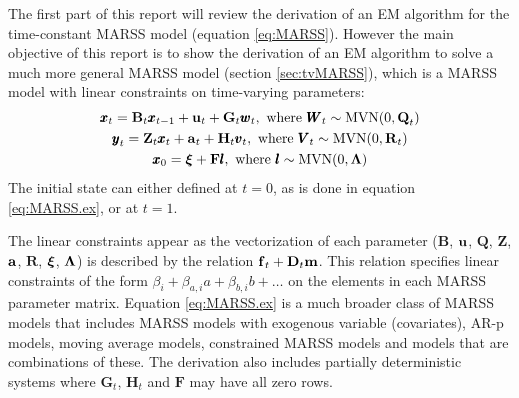 \documentclass[]{article}
\def\xixi{\mbox{\boldmath $\xi$}}
\def\LAM{\mbox{\boldmath $\Lambda$}}
\def\ZZ{\mbox{$\mathbf Z$}}	\def\zz{\mbox{$\mathbf z$}}
\def\BB{\mbox{$\mathbf B$}}	\def\bb{\mbox{$\mathbf b$}}
\def\DD{\mbox{$\mathbf D$}}	\def\dd{\mbox{$\mathbf d$}}
\def\FF{\mbox{$\mathbf F$}} \def\ff{\mbox{$\mathbf f$}}
\def\GG{\mbox{$\mathbf G$}}	\def\gg{\mbox{$\mathbf g$}}
\def\HH{\mbox{$\mathbf H$}}	\def\hh{\mbox{$\mathbf h$}}
\def\QQ{\mbox{$\mathbf Q$}}	 \def\qq{\mbox{$\mathbf q$}}
\def\RR{\mbox{$\mathbf R$}}	 \def\rr{\mbox{$\mathbf r$}}
\def\VV{\mbox{$\pmb{V}$}}	\def\vv{\mbox{$\pmb{v}$}}
\def\WW{\mbox{$\pmb{W}$}}	\def\ww{\mbox{$\pmb{w}$}}
\begin{document}
The first part of this report will review the derivation of an EM algorithm for the time-constant MARSS model (equation \ref{eq:MARSS}).  However the main objective of this report is to show the derivation of an EM algorithm to solve a much more general MARSS model  (section \ref{sec:tvMARSS}), which is a MARSS model with linear constraints on time-varying parameters: 
\begin{equation}\label{eq:MARSS.ex}
\begin{gathered}
\xx_t = \BB_t\xx_{t-1} + \uu_t + \GG_t\ww_t, \text{ where } \WW_t \sim \mathrm{MVN}(0,\QQ_t)\\
\yy_t = \ZZ_t\xx_t + \aa_t + \HH_t\vv_t, \text{ where } \VV_t \sim \mathrm{MVN}(0,\RR_t)\\
\xx_{0} = \xixi + \FF\ll, \text{ where }  \ll \sim \mathrm{MVN}(0,\LAM)
\end{gathered}
\end{equation}
The initial state can either defined at $t=0$, as is done in equation \ref{eq:MARSS.ex}, or at $t=1$.  

The linear constraints appear as the vectorization of each parameter ($\BB$, $\uu$, $\QQ$, $\ZZ$, $\aa$, $\RR$, $\xixi$, $\LAM$) is described by the relation $\ff_t+\DD_t\mm$. This relation  specifies linear constraints of the form $\beta_i + \beta_{a,i} a + \beta_{b,i} b + \dots$ on the elements in each MARSS parameter matrix. Equation \ref{eq:MARSS.ex} is a much broader class of MARSS models that includes MARSS models with exogenous variable (covariates), AR-p models, moving average models, constrained MARSS models and models that are combinations of these. The derivation also includes partially deterministic systems where $\GG_t$, $\HH_t$ and $\FF$ may have all zero rows.
\end{document}
